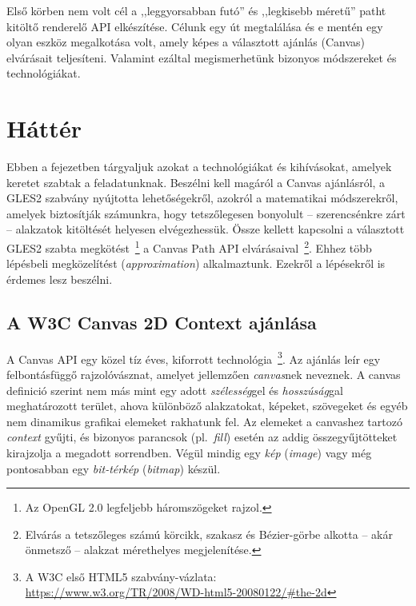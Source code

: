 \documentclass[12pt]{report}
\theoremstyle{definition}
\newcommand{\inenglish}[1]{\textsl{#1}}
\begin{document}
  Első körben nem volt cél a ,,leggyorsabban futó'' és ,,legkisebb
méretű'' patht kitöltő renderelő API elkészítése. Célunk egy út megtalálása és
e mentén egy olyan eszköz megalkotása volt, amely képes a választott ajánlás
(Canvas) elvárásait teljesíteni. Valamint ezáltal megismerhetünk bizonyos
módszereket és technológiákat.



    \chapter{Háttér}
    \label{Háttér}

  Ebben a fejezetben tárgyaljuk azokat a technológiákat és kihívásokat,
amelyek keretet szabtak a feladatunknak. Beszélni kell magáról a Canvas
ajánlásról, a GLES2 szabvány nyújtotta lehetőségekről, azokról a matematikai
módszerekről, amelyek biztosítják számunkra, hogy tetszőlegesen bonyolult --
szerencsénkre zárt -- alakzatok kitöltését helyesen elvégezhessük. Össze
kellett kapcsolni a választott GLES2 szabta megkötést~\footnote { Az OpenGL 2.0
legfeljebb háromszögeket rajzol. } a Canvas Path API elvárásaival~\footnote {
Elvárás a tetszőleges számú körcikk, szakasz és Bézier-görbe alkotta -- akár
önmetsző -- alakzat mérethelyes megjelenítése. }. Ehhez több lépésbeli
megközelítést (\inenglish{approximation}) alkalmaztunk. Ezekről a lépésekről is
érdemes lesz beszélni.

    \section[A Canvas ajánlás]{A W3C Canvas 2D Context ajánlása}
    \label{A Canvas ajánlás}

  A Canvas API egy közel tíz éves, kiforrott technológia~\footnote {A W3C első
HTML5 szabvány-vázlata:\\ \footnotesize{
\url{https://www.w3.org/TR/2008/WD-html5-20080122/\#the-2d}} }. Az ajánlás leír
egy felbontásfüggő rajzolóvásznat, amelyet jellemzően \emph{canvas}nek
neveznek. A canvas definició szerint nem más mint egy adott \emph{szélesség}gel
és \emph{hosszúság}gal meghatározott terület, ahova különböző alakzatokat,
képeket, szövegeket és egyéb nem dinamikus grafikai elemeket rakhatunk fel. Az
elemeket a canvashez tartozó \emph{context} gyűjti, és bizonyos parancsok
(pl.~\emph{fill}) esetén az addig összegyűjtötteket kirajzolja a megadott
sorrendben. Végül mindig egy \emph{kép} (\inenglish{image}) vagy még
pontosabban egy \emph{bit-térkép} (\inenglish{bitmap}) készül.
\end{document}
